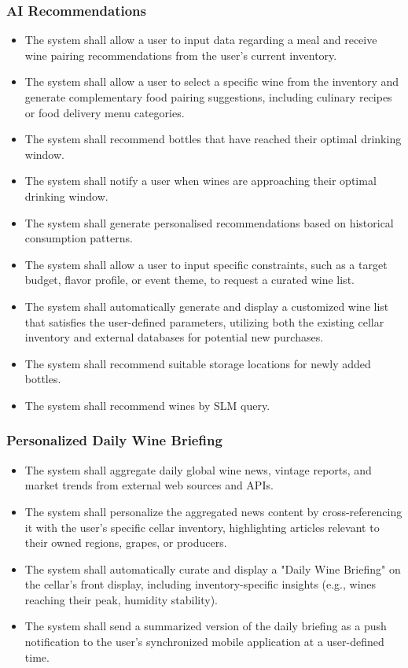 \documentclass[conference]{IEEEtran}
\begin{document}
\subsubsection{AI Recommendations}
\begin{itemize}
    \item The system shall allow a user to input data regarding a meal and receive wine pairing recommendations from the user's current inventory.
    \item The system shall allow a user to select a specific wine from the inventory and generate complementary food pairing suggestions, including culinary recipes or food delivery menu categories.
    \item The system shall recommend bottles that have reached their optimal drinking window.
    \item The system shall notify a user when wines are approaching their optimal drinking window.
    \item The system shall generate personalised recommendations based on historical consumption patterns.
    \item The system shall allow a user to input specific constraints, such as a target budget, flavor profile, or event theme, to request a curated wine list.
    \item The system shall automatically generate and display a customized wine list that satisfies the user-defined parameters, utilizing both the existing cellar inventory and external databases for potential new purchases.
    \item The system shall recommend suitable storage locations for newly added bottles.
    \item The system shall recommend wines by SLM query.
\end{itemize}

\subsubsection{Personalized Daily Wine Briefing}
\begin{itemize}
    \item The system shall aggregate daily global wine news, vintage reports, and market trends from external web sources and APIs.
    \item The system shall personalize the aggregated news content by cross-referencing it with the user's specific cellar inventory, highlighting articles relevant to their owned regions, grapes, or producers.
    \item The system shall automatically curate and display a "Daily Wine Briefing" on the cellar's front display, including inventory-specific insights (e.g., wines reaching their peak, humidity stability).
    \item The system shall send a summarized version of the daily briefing as a push notification to the user's synchronized mobile application at a user-defined time.
\end{itemize}
\end{document}
